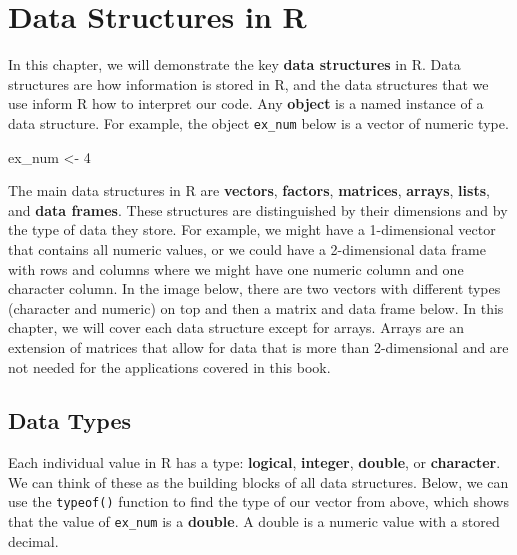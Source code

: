 \documentclass[
  letterpaper,
]{krantz}
\makeatletter
\newenvironment{Shaded}{\begin{snugshade}}{\end{snugshade}}
\newcommand{\DecValTok}[1]{\textcolor[rgb]{0.68,0.00,0.00}{#1}}
\newcommand{\NormalTok}[1]{\textcolor[rgb]{0.00,0.23,0.31}{#1}}
\newcommand{\OtherTok}[1]{\textcolor[rgb]{0.00,0.23,0.31}{#1}}
\newenvironment{kframe}{%
\medskip{}
\setlength{\fboxsep}{.8em}
 \def\at@end@of@kframe{}%
 \ifinner\ifhmode%
  \def\at@end@of@kframe{\end{minipage}}%
  \begin{minipage}{\columnwidth}%
 \fi\fi%
 \def\FrameCommand##1{\hskip\@totalleftmargin \hskip-\fboxsep
 \colorbox{shadecolor}{##1}\hskip-\fboxsep
     \hskip-\linewidth \hskip-\@totalleftmargin \hskip\columnwidth}%
 \MakeFramed {\advance\hsize-\width
   \@totalleftmargin\z@ \linewidth\hsize
   \@setminipage}}%
 {\par\unskip\endMakeFramed%
 \at@end@of@kframe}
\renewenvironment{Shaded}{\begin{kframe}}{\end{kframe}}
\makeatother
\begin{document}

\hypertarget{sec-data-structures}{%
\chapter{Data Structures in R}\label{sec-data-structures}}

In this chapter, we will demonstrate the key \textbf{data structures} in
R. Data structures are how information is stored in R, and the data
structures that we use inform R how to interpret our code. Any
\textbf{object} is a named instance of a data structure. For example,
the object \texttt{ex\_num} below is a vector of numeric type.

\begin{Shaded}
\begin{Highlighting}[]
\NormalTok{ex\_num }\OtherTok{\textless{}{-}} \DecValTok{4}
\end{Highlighting}
\end{Shaded}

The main data structures in R are \textbf{vectors}, \textbf{factors},
\textbf{matrices}, \textbf{arrays}, \textbf{lists}, and \textbf{data
frames}. These structures are distinguished by their dimensions and by
the type of data they store. For example, we might have a 1-dimensional
vector that contains all numeric values, or we could have a
2-dimensional data frame with rows and columns where we might have one
numeric column and one character column. In the image below, there are
two vectors with different types (character and numeric) on top and then
a matrix and data frame below. In this chapter, we will cover each data
structure except for arrays. Arrays are an extension of matrices that
allow for data that is more than 2-dimensional and are not needed for
the applications covered in this book.

\hypertarget{data-types}{%
\section{Data Types}\label{data-types}}

Each individual value in R has a type: \textbf{logical},
\textbf{integer}, \textbf{double}, or \textbf{character}. We can think
of these as the building blocks of all data structures. Below, we can
use the \texttt{typeof()} function to find the type of our vector from
above, which shows that the value of \texttt{ex\_num} is a
\textbf{double}. A double is a numeric value with a stored decimal.
\end{document}
